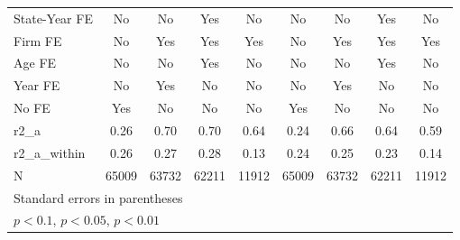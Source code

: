 {\begin{tabular}{l*{8}{c}}
\addlinespace
State-Year FE       &          No         &          No         &         Yes         &          No         &          No         &          No         &         Yes         &          No         \\
\addlinespace
Firm FE             &          No         &         Yes         &         Yes         &         Yes         &          No         &         Yes         &         Yes         &         Yes         \\
\addlinespace
Age FE              &          No         &          No         &         Yes         &          No         &          No         &          No         &         Yes         &          No         \\
\addlinespace
Year FE             &          No         &         Yes         &          No         &          No         &          No         &         Yes         &          No         &          No         \\
\addlinespace
No FE               &         Yes         &          No         &          No         &          No         &         Yes         &          No         &          No         &          No         \\
\midrule
r2\_a                &        0.26         &        0.70         &        0.70         &        0.64         &        0.24         &        0.66         &        0.64         &        0.59         \\
r2\_a\_within         &        0.26         &        0.27         &        0.28         &        0.13         &        0.24         &        0.25         &        0.23         &        0.14         \\
N                   &       65009         &       63732         &       62211         &       11912         &       65009         &       63732         &       62211         &       11912         \\
\bottomrule
\multicolumn{9}{l}{\footnotesize Standard errors in parentheses}\\
\multicolumn{9}{l}{\footnotesize \sym{*} \(p<0.1\), \sym{**} \(p<0.05\), \sym{***} \(p<0.01\)}\\
\end{tabular}
}
